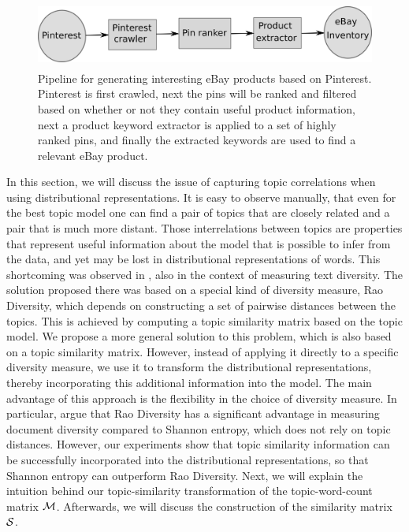\begin{figure}
\centering
\includegraphics[height=2.2cm]{figures/pinterest-pipeline.png}
\caption{Pipeline for generating interesting eBay products based on Pinterest. Pinterest is first crawled, next the pins will be ranked and filtered based on whether or not they contain useful product information, next a product keyword extractor is applied to a set of highly ranked pins, and finally the extracted keywords are used to find a relevant eBay product.}
\label{fig:pinterest-pipeline}
\end{figure}

In this section, we will discuss the issue of capturing topic
correlations when using distributional representations. It is easy to
observe manually, that even for the best topic model one can find a
pair of topics that are closely related and a pair that is much more
distant. Those interrelations between topics are 
properties that represent useful information about the model that is
possible to infer from the data, and yet
may be lost in distributional representations of words. 
This shortcoming was observed in \cite{bache:2013},
also in the context of measuring text diversity. The solution proposed
there was based on a special kind of diversity measure, Rao Diversity,
which depends on constructing a set of pairwise distances between the
topics. This is achieved by computing a topic similarity matrix based on
the topic model. We propose a more general solution to this problem,
which is also based on a topic similarity matrix. However, instead of
applying it directly to a specific diversity measure, we use it to
transform the distributional representations, thereby incorporating this
additional information into the model. The main advantage of this
approach is the flexibility in the choice of diversity measure. In
particular, \cite{bache:2013} argue that Rao Diversity has a
significant advantage in measuring document diversity compared to
Shannon entropy, which does not rely on topic distances. However, our
experiments show that topic similarity information can be successfully
incorporated into the distributional representations, so that Shannon
entropy can outperform Rao Diversity.  Next, we will explain the
intuition behind our topic-similarity transformation of the
topic-word-count matrix ${\mathcal M}$. Afterwards, we will discuss the
construction of the similarity matrix ${\mathcal S}$.

